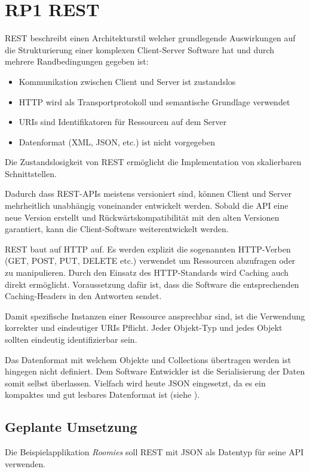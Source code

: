 \section{RP1 REST}
\label{sec:principle-rp1-rest}

\gls{REST} \cite{REST} beschreibt einen Architekturstil welcher grundlegende Auswirkungen auf die Strukturierung einer komplexen Client-Server Software hat und durch mehrere Randbedingungen gegeben ist:
\begin{itemize}
	\item Kommunikation zwischen Client und Server ist zustandslos
	\item HTTP wird als Transportprotokoll und semantische Grundlage verwendet
	\item \glspl{URI} sind Identifikatoren für Ressourcen auf dem Server
	\item Datenformat (XML, JSON, etc.) ist nicht vorgegeben
\end{itemize}

Die Zustandslosigkeit von REST ermöglicht die Implementation von skalierbaren Schnittstellen.

Dadurch dass REST-APIs meistens versioniert sind, können Client und Server mehrheitlich unabhängig voneinander entwickelt werden.
Sobald die API eine neue Version erstellt und Rückwärtskompatibilität mit den alten Versionen garantiert, kann die Client-Software weiterentwickelt werden.

REST baut auf HTTP auf. Es werden explizit die sogenannten HTTP-Verben (GET, POST, PUT, DELETE etc.) verwendet um Ressourcen abzufragen oder zu manipulieren.
Durch den Einsatz des HTTP-Standards wird Caching auch direkt ermöglicht. Voraussetzung dafür ist, dass die Software die entsprechenden Caching-Headers in den Antworten sendet.

Damit spezifische Instanzen einer Ressource ansprechbar sind, ist die Verwendung korrekter und eindeutiger \glspl{URI} Pflicht. Jeder Objekt-Typ und jedes Objekt sollten eindeutig identifizierbar sein.

Das Datenformat mit welchem Objekte und Collections übertragen werden ist hingegen nicht definiert. Dem Software Entwickler ist die Serialisierung der Daten somit selbst überlassen.
Vielfach wird heute \gls{JSON} eingesetzt, da es ein kompaktes und gut lesbares Datenformat ist (siehe \cite{ProgrammableWebByeXML}).

\subsection*{Geplante Umsetzung}
Die Beispielapplikation \emph{Roomies} soll REST mit JSON als Datentyp für seine API verwenden.

